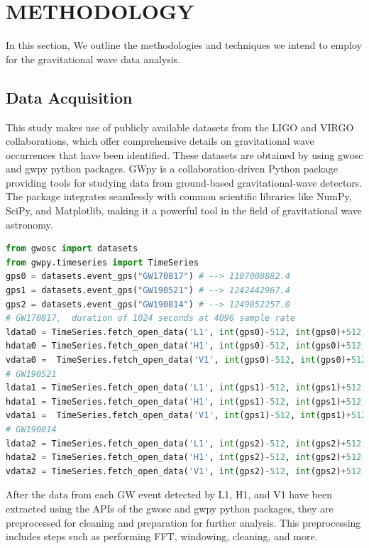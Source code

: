 \chapter{METHODOLOGY}
\onehalfspacing

In this section, We outline the methodologies and techniques we intend to employ for the gravitational wave data analysis.

\section{Data Acquisition}
This study makes use of publicly available datasets from the LIGO and VIRGO collaborations, which offer comprehensive details on gravitational wave occurrences that have been identified. These datasets are obtained by using gwosc and gwpy python packages. GWpy \cite{gwpy} is a collaboration-driven Python package providing tools for studying data from ground-based gravitational-wave detectors. The package integrates seamlessly with common scientific libraries like NumPy, SciPy, and Matplotlib, making it a powerful tool in the field of gravitational wave astronomy.

\begin{lstlisting}[language=Python, caption=Downloading data from GWOSC using GWPY, label=code:strain]
from gwosc import datasets
from gwpy.timeseries import TimeSeries
gps0 = datasets.event_gps("GW170817") # --> 1187008882.4
gps1 = datasets.event_gps("GW190521") # --> 1242442967.4
gps2 = datasets.event_gps("GW190814") # --> 1249852257.0 
# GW170817,  duration of 1024 seconds at 4096 sample rate
ldata0 = TimeSeries.fetch_open_data('L1', int(gps0)-512, int(gps0)+512, cache=True)#Livingston
hdata0 = TimeSeries.fetch_open_data('H1', int(gps0)-512, int(gps0)+512, cache=True) #Hanford 
vdata0 =  TimeSeries.fetch_open_data('V1', int(gps0)-512, int(gps0)+512, cache=True) #VIRGO
# GW190521
ldata1 = TimeSeries.fetch_open_data('L1', int(gps1)-512, int(gps1)+512, cache=True)
hdata1 = TimeSeries.fetch_open_data('H1', int(gps1)-512, int(gps1)+512, cache=True) 
vdata1 =  TimeSeries.fetch_open_data('V1', int(gps1)-512, int(gps1)+512, cache=True) 
# GW190814
ldata2 = TimeSeries.fetch_open_data('L1', int(gps2)-512, int(gps2)+512, cache=True)
hdata2 = TimeSeries.fetch_open_data('H1', int(gps2)-512, int(gps2)+512, cache=True) 
vdata2 = TimeSeries.fetch_open_data('V1', int(gps2)-512, int(gps2)+512, cache=True) 
\end{lstlisting}

After the data from each GW event detected by L1, H1, and V1 have been extracted using the APIs of the gwosc and gwpy python packages, they are preprocessed for cleaning and preparation for further analysis. This preprocessing includes steps such as performing FFT, windowing, cleaning, and more.

